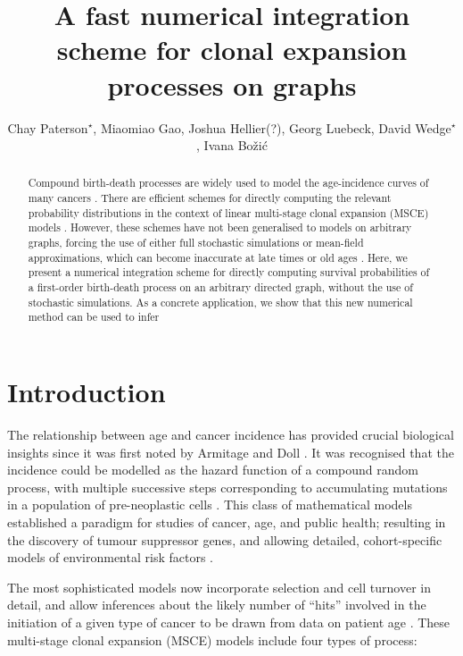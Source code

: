 \documentclass{article}
\title{A fast numerical integration scheme for clonal expansion processes on graphs}
\author{Chay Paterson${}^\star$, Miaomiao Gao, Joshua Hellier(?), Georg Luebeck, David Wedge${}^\star$, Ivana Bo\v{z}i\'{c}}
\begin{document}
\maketitle

\begin{abstract}
Compound birth-death processes are widely used to model the age-incidence curves
of many cancers \cite{luebeck2013impact}. There are efficient schemes for
directly computing the relevant %
probability distributions in the context of linear multi-stage clonal expansion
(MSCE) models \cite{meza2008age}. However, these schemes have not been generalised to
models on arbitrary graphs, forcing the use of either full stochastic simulations or
mean-field approximations, which can become inaccurate at late times or old ages
\cite{patersonbozic2020colorectal,Paterson2021vs}.
Here, we present a numerical integration scheme for directly computing survival
probabilities of a first-order birth-death process on an arbitrary
directed graph, without the use of stochastic
simulations. As a concrete application, we show that this new numerical method
can be  used to infer
\end{abstract}

\section{Introduction}

The relationship between age and cancer incidence has provided crucial
biological insights since it was first noted by Armitage and Doll
\cite{armitage_doll,armitage1957two,knudson1971mutation}. It was 
recognised that the incidence could be modelled as the hazard function of a
compound random process, with multiple successive steps corresponding to
accumulating mutations in a population of pre-neoplastic cells
\cite{armitage_doll,moolgavkar1979two}. This class of mathematical models
established a paradigm for studies of cancer, age, and public health; resulting
in the discovery of tumour suppressor genes, and allowing detailed,
cohort-specific models of environmental risk factors
\cite{knudson1971mutation,conolly2003biologically,meza2008age}. 

The most sophisticated
models now incorporate selection and cell turnover in detail, and allow
inferences about the likely number of ``hits'' involved in the initiation of a
given type of cancer to be drawn from data on patient age \cite{moolgavkar1992multistage,luebeck2013impact}. These multi-stage clonal expansion (MSCE) models include four types of process:
\end{document}

